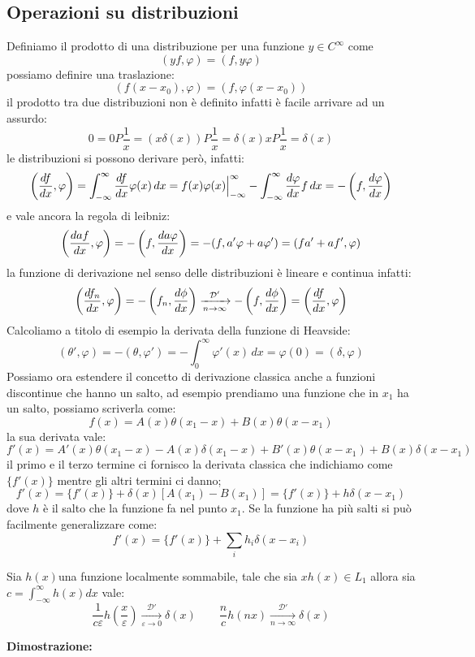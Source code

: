 \subsection{Operazioni su distribuzioni}
Definiamo il prodotto di una distribuzione per una funzione $y\in C^\infty$ come
\[(yf,\varphi) = (f,y\varphi)\]
possiamo definire una traslazione:
\[(f(x-x_0),\varphi) = (f,\varphi(x-x_0))\]
il prodotto tra due distribuzioni non è definito infatti è facile arrivare ad un assurdo:
\[0 = 0P\frac{1}{x} = (x\delta(x))P\frac{1}{x} = \delta(x)xP\frac{1}{x} = \delta(x)\]
le distribuzioni si possono derivare però, infatti:
\[\left(\frac{d f}{d x},\varphi\right) = \int_{-\infty}^\infty\frac{d f}{d x}\varphi(x)\,dx = f(x)\varphi(x)\Big|_{-\infty}^\infty - \int_{-\infty}^\infty\frac{d \varphi}{d x}f\,dx =-\left(f,\frac{d \varphi}{d x}\right) \]
e vale ancora la regola di leibniz:
\[\left(\frac{d af}{d x},\varphi\right) = -\left(f,\frac{d a\varphi}{d x}\right)  = -(f,a'\varphi+a\varphi') = (fa' + af' ,\varphi)\]
la funzione di derivazione nel senso delle distribuzioni è lineare e continua infatti:
\[\left(\frac{d f_n}{d x},\varphi\right) = - \left(f_n,\frac{d \phi}{d x}\right)  \xrightarrow[n\to \infty]{\mathcal{D}'} -\left(f,\frac{d \phi}{d x}\right) =  \left(\frac{d f}{d x},\varphi\right)\]
Calcoliamo a titolo di esempio la derivata della funzione di Heavside:
\[(\theta',\varphi) = -(\theta,\varphi') = -\int_0^\infty\varphi'(x)\,dx = \varphi(0) = (\delta,\varphi)\]
Possiamo ora estendere il concetto di derivazione classica anche a funzioni discontinue che hanno un salto, ad esempio prendiamo una funzione che in $x_1$ ha un salto, possiamo scriverla come:
\[f(x) = A(x)\theta(x_1-x) + B(x)\theta(x-x_1)\]
la sua derivata vale:
\[f'(x) = A'(x)\theta(x_1-x)-A(x)\delta(x_1-x) + B'(x)\theta(x-x_1) + B(x)\delta(x-x_1)\]
il primo e il terzo termine ci fornisco la derivata classica che indichiamo come $\{f'(x)\}$ mentre gli altri termini ci danno;
\[f'(x)= \{f'(x)\} + \delta(x)[A(x_1)-B(x_1)] =  \{f'(x)\} + h\delta(x-x_1)\]
dove $h$ è il salto che la funzione fa nel punto $x_1$. Se la funzione ha più salti si può facilmente generalizzare come:
\[f'(x) = \{f'(x)\} +\sum_i h_i\delta(x-x_i)\]
\begin{thm}
Sia $h(x)$una funzione localmente sommabile, tale che sia $xh(x)\in L_1$ allora sia $c =\int_{-\infty}^\infty h(x)dx$ vale:
\[\frac{1}{c\varepsilon}h\left(\frac{x}{\varepsilon}\right)  \xrightarrow[\varepsilon\to 0]{\mathcal{D'}} \delta(x) \qquad \frac{n}{c}h(nx)   \xrightarrow[n\to \infty]{\mathcal{D}'}\delta(x)\] 
\end{thm}
\hspace{-1.6em}\textbf{Dimostrazione:}\\
